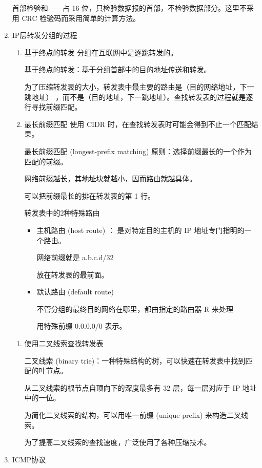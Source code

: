 \documentclass[11pt]{article}
\begin{document}
\begin{enumerate}
首部检验和——占 16 位，只检验数据报的首部，不检验数据部分。这里不采用 CRC 检验码而采用简单的计算方法。 
\item IP层转发分组的过程
\label{sec:orgd3397e4}

\begin{enumerate}
\item 基于终点的转发
分组在互联网中是逐跳转发的。

基于终点的转发：基于分组首部中的目的地址传送和转发。

为了压缩转发表的大小，转发表中最主要的路由是（目的网络地址，下一跳地址） ，而不是（目的地址，下一跳地址）。查找转发表的过程就是逐行寻找前缀匹配。

\item 最长前缀匹配
使用 CIDR 时，在查找转发表时可能会得到不止一个匹配结果。 

最长前缀匹配 (longest-prefix matching) 原则：选择前缀最长的一个作为匹配的前缀。

网络前缀越长，其地址块就越小，因而路由就越具体。

可以把前缀最长的排在转发表的第 1 行。

转发表中的2种特殊路由
\begin{itemize}
\item 主机路由 (host route) ：
是对特定目的主机的 IP 地址专门指明的一个路由。

网络前缀就是 a.b.c.d/32

放在转发表的最前面。

\item 默认路由 (default route)

不管分组的最终目的网络在哪里，都由指定的路由器 R 来处理

用特殊前缀 0.0.0.0/0 表示。
\end{itemize}
\end{enumerate}


\begin{enumerate}
\item 使用二叉线索查找转发表

二叉线索 (binary trie)：一种特殊结构的树，可以快速在转发表中找到匹配的叶节点。

从二叉线索的根节点自顶向下的深度最多有 32 层，每一层对应于 IP 地址中的一位。

为简化二叉线索的结构，可以用唯一前缀 (unique prefix) 来构造二叉线索。

为了提高二叉线索的查找速度，广泛使用了各种压缩技术。
\end{enumerate}
\item ICMP协议
\label{sec:org8a7fea7}


\end{enumerate}
\end{document}
